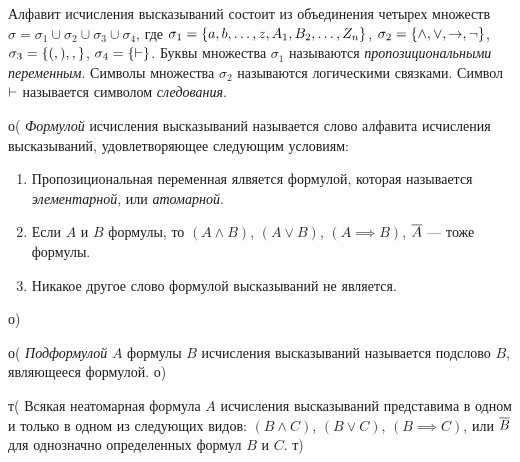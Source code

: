 \documentclass[letterpaper, 10pt]{article}
\theoremstyle{definition}
\begin{document}
Алфавит исчисления высказываний состоит из объединения четырех множеств $\sigma
= \sigma_1 \cup \sigma_2 \cup \sigma_3 \cup \sigma_4$, где $\sigma_1 =
\left\{a,b,\ldots,z,A_1,B_2,\ldots,Z_n\right\}$, $\sigma_2 = \left\{\land,\lor, \rightarrow,
\lnot\right\}$, $\sigma_3 = \left\{(,),,\right\}$, $\sigma_4 = \left\{\vdash\right\}$. Буквы множества
$\sigma_1$ называются \emph{пропозициональными переменным}. Символы множества
$\sigma_2$ называются логическими связками. Символ $\vdash$
называется символом \emph{следования}.

о(
\emph{Формулой} исчисления высказываний называется слово алфавита исчисления
высказываний, удовлетворяющее следующим условиям:
\begin{enumerate}
	\item Пропозициональная переменная ялвяется формулой, которая называется
		\emph{элементарной}, или \emph{атомарной}.
	\item Если $A$ и $B$ формулы, то $(A \land B)$, $(A \lor B)$, $(A \implies
		B)$, $\overline{A}$ --- тоже формулы.
	\item Никакое другое слово формулой высказываний не является.
\end{enumerate}
о)

о(
\emph{Подформулой} $A$ формулы $B$ исчисления высказываний называется подслово $B$,
являющееся формулой.
о)

т(
Всякая неатомарная формула $A$ исчисления высказываний представима в одном и
только в одном из следующих видов: $(B \land C)$, $(B \lor C)$, $(B \implies
C)$, или $\overline{B}$ для однозначно определенных формул $B$ и $C$.
т)
\end{document}
